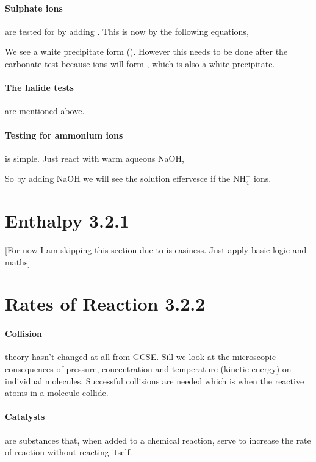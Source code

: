 	\paragraph{Sulphate ions} are tested for by adding . This is now by the following equations,
	\begin{center}
	\end{center}
	We see a white precipitate form (). However this needs to be done after the carbonate test because  ions will form , which is also a white precipitate.
	
	\paragraph{The halide tests} are mentioned above.
	
	\paragraph{Testing for ammonium ions} is simple. Just react with warm aqueous NaOH,
	\begin{center}
	\end{center}
	So by adding NaOH we will see the solution effervesce if the NH$_4^+$ ions.
	
\section{Enthalpy 3.2.1}
[For now I am skipping this section due to is easiness. Just apply basic logic and maths]

\section{Rates of Reaction 3.2.2}
	\paragraph{Collision} theory hasn't changed at all from GCSE. Sill we look at the microscopic consequences of pressure, concentration and temperature (kinetic energy) on individual molecules. Successful collisions are needed which is when the reactive atoms in a molecule collide.
	
	\paragraph{Catalysts} are substances that, when added to a chemical reaction, serve to increase the rate of reaction without reacting itself.
	
